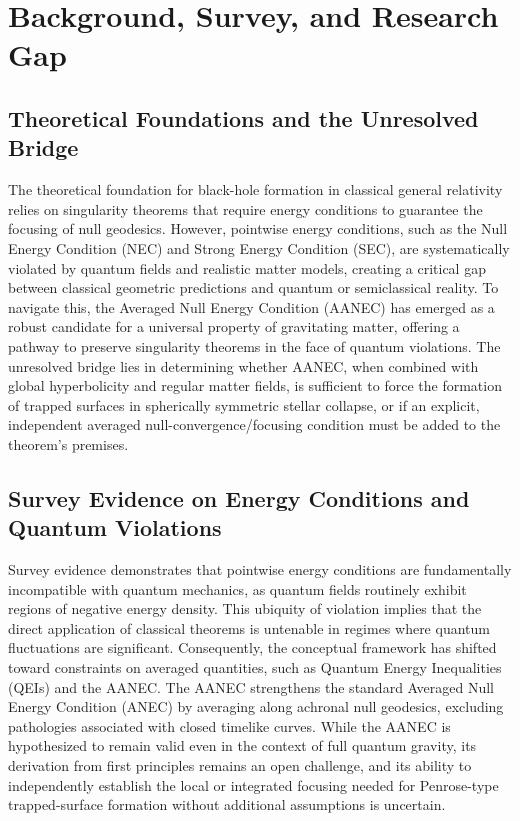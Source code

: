\documentclass[conference]{IEEEtran}
\begin{document}
\section{Background, Survey, and Research Gap}
\subsection{Theoretical Foundations and the Unresolved Bridge}
The theoretical foundation for black-hole formation in classical general relativity relies on singularity theorems that require energy conditions to guarantee the focusing of null geodesics. However, pointwise energy conditions, such as the Null Energy Condition (NEC) and Strong Energy Condition (SEC), are systematically violated by quantum fields and realistic matter models, creating a critical gap between classical geometric predictions and quantum or semiclassical reality. To navigate this, the Averaged Null Energy Condition (AANEC) has emerged as a robust candidate for a universal property of gravitating matter, offering a pathway to preserve singularity theorems in the face of quantum violations. The unresolved bridge lies in determining whether AANEC, when combined with global hyperbolicity and regular matter fields, is sufficient to force the formation of trapped surfaces in spherically symmetric stellar collapse, or if an explicit, independent averaged null-convergence/focusing condition must be added to the theorem's premises.~\cite{cite_0ed84243cf171bc4}

\subsection{Survey Evidence on Energy Conditions and Quantum Violations}
Survey evidence demonstrates that pointwise energy conditions are fundamentally incompatible with quantum mechanics, as quantum fields routinely exhibit regions of negative energy density. This ubiquity of violation implies that the direct application of classical theorems is untenable in regimes where quantum fluctuations are significant. Consequently, the conceptual framework has shifted toward constraints on averaged quantities, such as Quantum Energy Inequalities (QEIs) and the AANEC. The AANEC strengthens the standard Averaged Null Energy Condition (ANEC) by averaging along achronal null geodesics, excluding pathologies associated with closed timelike curves. While the AANEC is hypothesized to remain valid even in the context of full quantum gravity, its derivation from first principles remains an open challenge, and its ability to independently establish the local or integrated focusing needed for Penrose-type trapped-surface formation without additional assumptions is uncertain.~\cite{cite_0ed84243cf171bc4}
\end{document}
